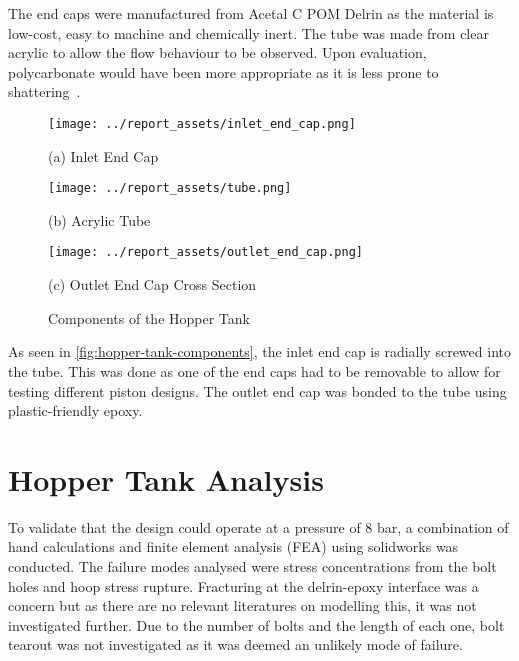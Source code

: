 The end caps were manufactured from Acetal C POM Delrin as the material is low-cost, easy to machine and chemically inert. The tube was made from clear acrylic to allow the flow behaviour to be observed. Upon evaluation, polycarbonate would have been more appropriate as it is less prone to shattering~\cite{SADEGHIESFAHLANI2021e06856}.
\begin{figure}[htbp]
    \centering

    \begin{minipage}{0.3\textwidth}
        \centering
        \texttt{[image: ../report\_assets/inlet\_end\_cap.png]}
        \caption*{(a) Inlet End Cap}
    \end{minipage}
    \hfill
    \begin{minipage}{0.3\textwidth}
        \centering
        \texttt{[image: ../report\_assets/tube.png]}
        \caption*{(b) Acrylic Tube}
    \end{minipage}
    \hfill
    \begin{minipage}{0.3\textwidth}
        \centering
        \texttt{[image: ../report\_assets/outlet\_end\_cap.png]}
        \caption*{(c) Outlet End Cap Cross Section}
    \end{minipage}
    \caption{Components of the Hopper Tank}\label{fig:hopper-tank-components}
\end{figure}
As seen in \autoref{fig:hopper-tank-components}, the inlet end cap is radially screwed into the tube. This was done as one of the end caps had to be removable to allow for testing different piston designs. The outlet end cap was bonded to the tube using plastic-friendly epoxy.
\section{Hopper Tank Analysis}
To validate that the design could operate at a pressure of 8 bar, a combination of hand calculations and finite element analysis (FEA) using solidworks was conducted. The failure modes analysed were stress concentrations from the bolt holes and hoop stress rupture. Fracturing at the delrin-epoxy interface was a concern but as there are no relevant literatures on modelling this, it was not investigated further. Due to the number of bolts and the length of each one, bolt tearout was not investigated as it was deemed an unlikely mode of failure.


